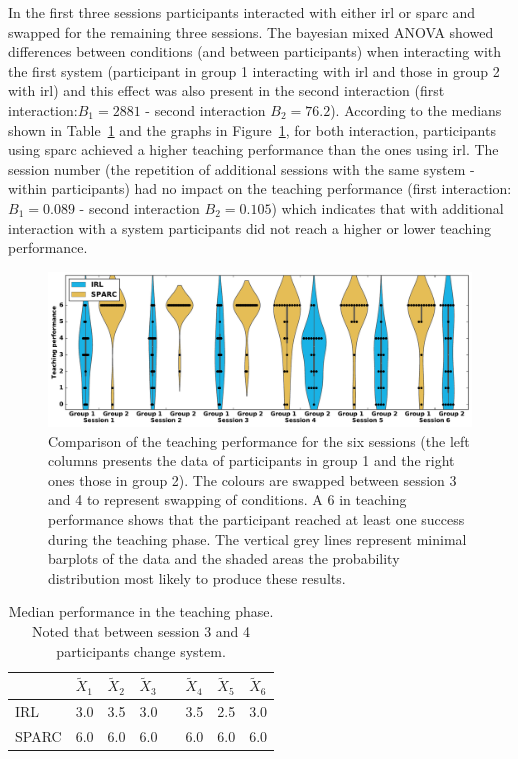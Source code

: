 In the first three sessions participants interacted with either \gls{irl} or \gls{sparc} and swapped for the remaining three sessions. The bayesian mixed ANOVA showed differences between conditions (and between participants) when interacting with the first system (participant in group 1 interacting with \gls{irl} and those in group 2 with \gls{irl}) and this effect was also present in the second interaction (first interaction:$B_1=2881$ - second interaction $B_2 = 76.2$). According to the medians shown in Table~\ref{tab:control_teaching_perf} and the graphs in Figure~\ref{fig:control_teaching_performance}, for both interaction, participants using \gls{sparc} achieved a higher teaching performance than the ones using \gls{irl}. The session number (the repetition of additional sessions with the same system - within participants) had no impact on the teaching performance (first interaction: $B_1=0.089$ - second interaction $B_2=0.105$) which indicates that with additional interaction with a system participants did not reach a higher or lower teaching performance.

\begin{figure}[ht]
	\includegraphics[width=\textwidth]{teaching_performance.pdf}
	\centering
	\caption{Comparison of the teaching performance for the six sessions (the left columns presents the data of participants in group 1 and the right ones those in group 2). The colours are swapped between session 3 and 4 to represent swapping of conditions. A 6 in teaching performance shows that the participant reached at least one success during the teaching phase. The vertical grey lines represent minimal barplots of the data and the shaded areas the probability distribution most likely to produce these results.
	}
	\label{fig:control_teaching_performance}
\end{figure}

\begin{table}[ht]
	\centering
	\caption{Median performance in the teaching phase. Noted that between session 3 and 4 participants change system.}
	\label{tab:control_teaching_perf}
	\begin{tabular}{@{}llllllll@{}}\toprule
		& $\widetilde{X}_{1}$ & $\widetilde{X}_{2}$ & $\widetilde{X}_{3}$& & $\widetilde{X}_{4}$ & $\widetilde{X}_{5}$ & $\widetilde{X}_{6}$\\ 
		\midrule
		IRL & 3.0 & 3.5 & 3.0 & \crossarr & 3.5 & 2.5 & 3.0\\
		SPARC & 6.0 & 6.0 & 6.0 && 6.0 & 6.0 & 6.0\\
		\bottomrule
	\end{tabular}
\end{table}

